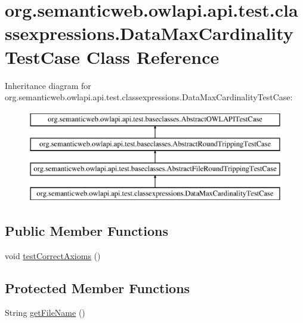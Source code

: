 \hypertarget{classorg_1_1semanticweb_1_1owlapi_1_1api_1_1test_1_1classexpressions_1_1_data_max_cardinality_test_case}{\section{org.\-semanticweb.\-owlapi.\-api.\-test.\-classexpressions.\-Data\-Max\-Cardinality\-Test\-Case Class Reference}
\label{classorg_1_1semanticweb_1_1owlapi_1_1api_1_1test_1_1classexpressions_1_1_data_max_cardinality_test_case}
}
Inheritance diagram for org.\-semanticweb.\-owlapi.\-api.\-test.\-classexpressions.\-Data\-Max\-Cardinality\-Test\-Case\-:\begin{figure}[H]
\begin{center}
\leavevmode
\includegraphics[height=4.000000cm]{classorg_1_1semanticweb_1_1owlapi_1_1api_1_1test_1_1classexpressions_1_1_data_max_cardinality_test_case}
\end{center}
\end{figure}
\subsection*{Public Member Functions}
\begin{DoxyCompactItemize}
\item 
void \hyperlink{classorg_1_1semanticweb_1_1owlapi_1_1api_1_1test_1_1classexpressions_1_1_data_max_cardinality_test_case_a2709d1f80ab13d0c2d9cf5f9f2b602b0}{test\-Correct\-Axioms} ()
\end{DoxyCompactItemize}
\subsection*{Protected Member Functions}
\begin{DoxyCompactItemize}
\item 
String \hyperlink{classorg_1_1semanticweb_1_1owlapi_1_1api_1_1test_1_1classexpressions_1_1_data_max_cardinality_test_case_abb234607ff9b89b4c0e182daa559859a}{get\-File\-Name} ()
\end{DoxyCompactItemize}


